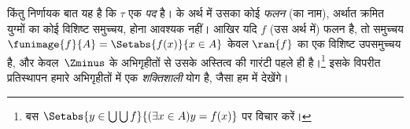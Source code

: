 \documentclass[../../../include/open-logic-section]{subfiles}
\begin{document}
किंतु निर्णायक बात यह है कि $\tau$ एक \emph{पद} है।
 के अर्थ में उसका कोई \emph{फलन} (का नाम), अर्थात
क्रमित युग्मों का कोई विशिष्ट समुच्चय, होना आवश्यक नहीं। आखिर यदि $f$ (उस
अर्थ में) फलन है, तो समुच्चय
$\funimage{f}{A} = \Setabs{f(x)}{x \in A}$ केवल $\ran{f}$ का एक विशिष्ट
उपसमुच्चय है, और केवल~$\Zminus$ के अभिगृहीतों से उसके अस्तित्व की गारंटी
पहले ही है।\footnote{बस
$\Setabs{y \in \bigcup \bigcup f}{(\exists x \in A)y = f(x)}$ पर विचार
करें।} इसके विपरीत प्रतिस्थापन हमारे अभिगृहीतों में एक \emph{शक्तिशाली}
योग है, जैसा हम  में देखेंगे।
\end{document}
